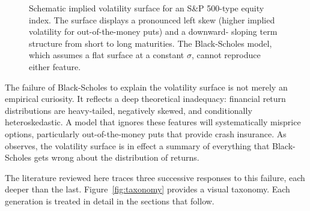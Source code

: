 \documentclass[12pt, a4paper]{article}
\begin{document}
\begin{figure}[H]
\centering
{}
\caption{Schematic implied volatility surface for an S\&P 500-type
equity index. The surface displays a pronounced left skew
(higher implied volatility for out-of-the-money puts) and a downward-
sloping term structure from short to long maturities. The
Black-Scholes model, which assumes a flat surface at a constant
$\sigma$, cannot reproduce either feature.}
\label{fig:surface}
\end{figure}

The failure of Black-Scholes to explain the volatility surface is not
merely an empirical curiosity. It reflects a deep theoretical
inadequacy: financial return distributions are heavy-tailed, negatively
skewed, and conditionally heteroskedastic. A model that ignores these
features will systematically misprice options, particularly
out-of-the-money puts that provide crash insurance. As
\citet{gatheral2006} observes, the volatility surface is in effect a
summary of everything that Black-Scholes gets wrong about the
distribution of returns.

The literature reviewed here traces three successive responses to this
failure, each deeper than the last. Figure~\ref{fig:taxonomy} provides
a visual taxonomy. Each generation is treated in detail in the sections
that follow.
\end{document}
